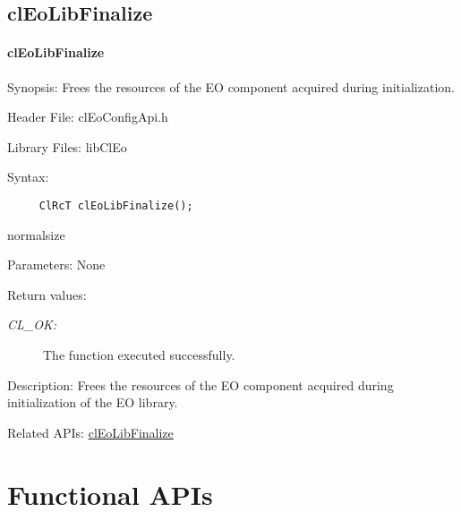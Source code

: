\begin{flushleft}
  \newpage
\subsection{clEoLibFinalize}
\hypertarget{pageeo202}{}\paragraph{cl\-Eo\-Lib\-Finalize}\label{pageeo202}
\begin{Desc}
\item[Synopsis:]Frees the resources of the EO component acquired during initialization.\end{Desc}
\begin{Desc}
\item[Header File:]clEoConfigApi.h\end{Desc}
\begin{Desc}
\item[Library Files:]lib\-Cl\-Eo\end{Desc}
\begin{Desc}
\item[Syntax:]

\footnotesize\begin{verbatim}     ClRcT clEoLibFinalize();
\end{verbatim}
  normalsize
\end{Desc}
\begin{Desc}
\item[Parameters:]None\end{Desc}
\begin{Desc}
\item[Return values:]
\begin{description}
\item[{\em CL\_\-OK:}]The function executed successfully.\end{description}
\end{Desc}
\begin{Desc}
\item[Description:]Frees the resources of the EO component acquired during initialization of the EO library.\end{Desc}
\begin{Desc}
\item[Related APIs:]\hyperlink{pageeo201}{clEoLibFinalize}\end{Desc}

\newpage

\section{Functional APIs}

\end{flushleft}
